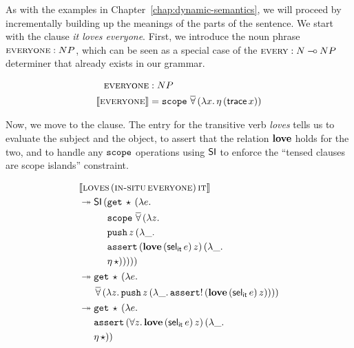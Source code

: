 As with the examples in Chapter~\ref{chap:dynamic-semantics}, we will
proceed by incrementally building up the meanings of the parts of the
sentence. We start with the clause \emph{it loves everyone}. First, we
introduce the noun phrase $\textsc{everyone} : NP$, which can be seen as a
special case of the $\textsc{every} : N \mathbin{{-}\mkern-3.5mu{\circ}} NP$ determiner that already
exists in our grammar.

\begin{align*}
  \textsc{everyone} &: NP \\
  \llbracket \textsc{everyone} \rrbracket &= \mathtt{scope}\,\mathop{\overline{\forall}}\,(\lambda x.\, \eta\,(\mathsf{trace}\,x))
\end{align*}

Now, we move to the clause. The entry for the transitive verb \emph{loves}
tells us to evaluate the subject and the object, to assert that the
relation $\textbf{love}$ holds for the two, and to handle any $\mathtt{scope}$
operations using $\mathsf{SI}$ to enforce the ``tensed clauses are scope islands''
constraint.

\begin{align*}
  &\llbracket \textsc{loves}\,(\textsc{in-situ}\,\textsc{everyone})\,\textsc{it} \rrbracket \\
  &\twoheadrightarrow \mathsf{SI}\,(\begin{aligned}[t]
      &\mathtt{get}\,\star\,(\lambda e.\,  \\
      &\mathtt{scope}\,\mathop{\overline{\forall}}\,(\lambda z.\,  \\
      &\mathtt{push}\,z\,(\lambda \_.\,  \\
      &\mathtt{assert}\,(\textbf{love}\,(\mathsf{sel}_{\mathsf{it}}\,e)\,z)\,(\lambda \_.\,  \\
      &\eta\,\star)))))
    \end{aligned} \\
  &\twoheadrightarrow \begin{aligned}[t]
      &\mathtt{get}\,\star\,(\lambda e.\,  \\
      &\mathop{\overline{\forall}}\,(\lambda z.\, \mathtt{push}\,z\,(\lambda \_.\, \mathtt{assert}!\,(\textbf{love}\,(\mathsf{sel}_{\mathsf{it}}\,e)\,z))))
    \end{aligned} \\
  &\twoheadrightarrow \begin{aligned}[t]
      &\mathtt{get}\,\star\,(\lambda e.\,  \\
      &\mathtt{assert}\,(\forall z.\, \textbf{love}\,(\mathsf{sel}_{\mathsf{it}}\,e)\,z)\,(\lambda \_.\,  \\
      &\eta\,\star))
    \end{aligned}
\end{align*}

